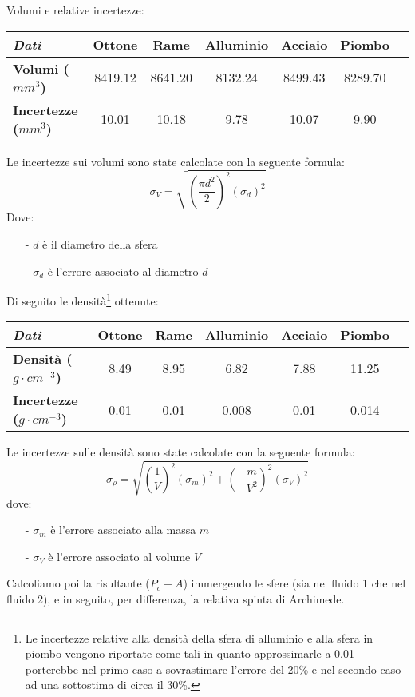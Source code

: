 \documentclass{article}
\begin{document}
\noindent Volumi e relative incertezze:
\begin{table}[!ht]
\centering
\begin{tabular}{lcccccc}
    \toprule
    \textit{Dati} &\textbf{Ottone} &\textbf{Rame} &\textbf{Alluminio} &\textbf{Acciaio} &\textbf{Piombo} \\
    \midrule
    \textbf{Volumi ($mm^3$)} &8419.12 &8641.20 &8132.24	&8499.43 &8289.70 \\
    \midrule
    \textbf{Incertezze ($mm^3$)} &10.01	&10.18	&9.78	&10.07	&9.90 \\
    \bottomrule
\end{tabular}
\end{table}

\noindent Le incertezze sui volumi sono state calcolate con la seguente formula: 
\begin{equation}
    \sigma_V = \sqrt{\left(\frac{\pi d^2}{2}\right)^2 \left(\sigma_{d}\right)^2}
\end{equation}
Dove:
\vspace{0.2cm}
\begin{itemize}
    \item [-] $d$ è il diametro della sfera
    \item [-] $\sigma_{d}$ è l'errore associato al diametro $d$
\end{itemize}
\medskip
\noindent Di seguito le densità\footnote{Le incertezze relative alla densità della sfera di alluminio e alla sfera in piombo vengono riportate come tali in quanto approssimarle a 0.01 porterebbe nel primo caso a sovrastimare l'errore del 20\% e nel secondo caso ad una sottostima di circa il 30\%.} ottenute:
\begin{table}[!ht]
\centering
\begin{tabular}{lcccccc}
    \toprule
    \textit{Dati} &\textbf{Ottone} &\textbf{Rame} &\textbf{Alluminio} &\textbf{Acciaio} &\textbf{Piombo} \\
    \midrule
    \textbf{Densità ($g\cdot cm^{-3}$)} &8.49 &8.95 &6.82 &7.88 &11.25 \\
    \midrule
    \textbf{Incertezze ($g\cdot cm^{-3}$)} &0.01	&0.01	&0.008	&0.01	&0.014 \\
    \bottomrule
\end{tabular}
\end{table}

\noindent Le incertezze sulle densità sono state calcolate con la seguente formula:
\begin{equation}
    \sigma_{\rho} = \sqrt{\left(\frac{1}{V}\right)^2 \left(\sigma_{m}\right)^2 + \left(-\frac{m}{V^2}\right)^2  \left(\sigma_{V}\right)^2}
\end{equation}
\newpage dove:
\begin{itemize}
    \item [-] $\sigma_{m}$ è l'errore associato alla massa $m$
    \item [-] $\sigma_{V}$ è l'errore associato al volume $V$
\end{itemize}
\vspace{0.3cm} 
Calcoliamo poi la risultante ($P_c - A$) immergendo le sfere (sia nel fluido 1 che nel fluido 2), e in seguito, per differenza, la relativa spinta di Archimede.
\end{document}
